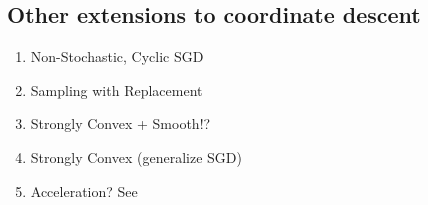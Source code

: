 	\subsection{Other extensions to coordinate descent}
	\begin{enumerate}
		\item Non-Stochastic, Cyclic SGD
		\item Sampling with Replacement
		\item Strongly Convex + Smooth!?
		\item Strongly Convex (generalize SGD)
		\item Acceleration? See \cite{tu2017breaking}
	\end{enumerate}


